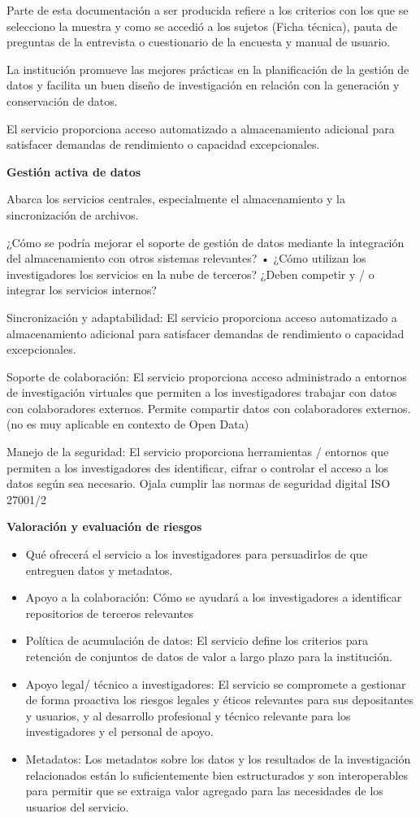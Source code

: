 \documentclass[
  14pt,
]{book}
\begin{document}
Parte de esta documentación a ser producida refiere a los criterios con los que se selecciono la muestra y como se accedió a los sujetos (Ficha técnica), pauta de preguntas de la entrevista o cuestionario de la encuesta y manual de usuario.

La institución promueve las mejores prácticas en la planificación de la gestión de datos y facilita un buen diseño de investigación en relación con la generación y conservación de datos.

El servicio proporciona acceso automatizado a almacenamiento adicional para satisfacer demandas de rendimiento o capacidad excepcionales.

\textbf{Gestión activa de datos}

Abarca los servicios centrales, especialmente el almacenamiento y la sincronización de archivos.

¿Cómo se podría mejorar el soporte de gestión de datos mediante la integración del almacenamiento con otros sistemas relevantes? • ¿Cómo utilizan los investigadores los servicios en la nube de terceros? ¿Deben competir y / o integrar los servicios internos?

Sincronización y adaptabilidad:
El servicio proporciona acceso automatizado a almacenamiento adicional para satisfacer demandas de rendimiento o capacidad excepcionales.

Soporte de colaboración: El servicio proporciona acceso administrado a entornos de investigación virtuales que permiten a los investigadores trabajar con datos con colaboradores externos. Permite compartir datos con colaboradores externos. (no es muy aplicable en contexto de Open Data)

Manejo de la seguridad: El servicio proporciona herramientas / entornos que permiten a los investigadores des identificar, cifrar o controlar el acceso a los datos según sea necesario. Ojala cumplir las normas de seguridad digital ISO 27001/2

\textbf{Valoración y evaluación de riesgos}

\begin{itemize}
\item
  Qué ofrecerá el servicio a los investigadores para persuadirlos de que entreguen datos y metadatos.
\item
  Apoyo a la colaboración: Cómo se ayudará a los investigadores a identificar repositorios de terceros relevantes
\item
  Política de acumulación de datos: El servicio define los criterios para retención de conjuntos de datos de valor a largo plazo para la institución.
\item
  Apoyo legal/ técnico a investigadores: El servicio se compromete a gestionar de forma proactiva los riesgos legales y éticos relevantes para sus depositantes y usuarios, y al desarrollo profesional y técnico relevante para los investigadores y el personal de apoyo.
\item
  Metadatos: Los metadatos sobre los datos y los resultados de la investigación relacionados están lo suficientemente bien estructurados y son interoperables para permitir que se extraiga valor agregado para las necesidades de los usuarios del servicio.
\end{itemize}
\end{document}
